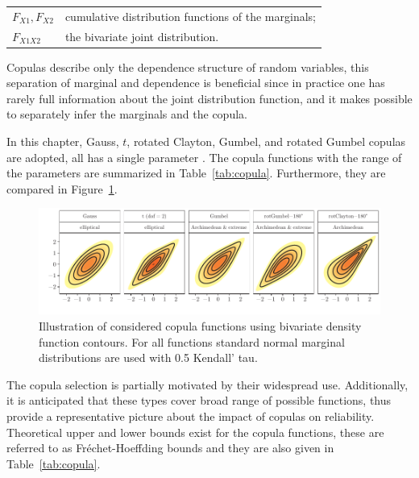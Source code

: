 \begin{tabular}{ll}
	$F_{X1}, F_{X2}$ & cumulative distribution functions of the marginals; \\
	$F_{X1X2}$ & the bivariate joint distribution.
\end{tabular} \medskip

\noindent
Copulas describe only the dependence structure of random variables, this separation of marginal and dependence is beneficial since in practice one has rarely full information about the joint distribution function, and it makes possible to separately infer the marginals and the copula.

In this chapter, Gauss, $t$, rotated Clayton, Gumbel, and rotated Gumbel copulas are adopted, all has a single parameter \citep{Nelson2006, Joe1997}. The copula functions with the range of the parameters are summarized in Table~\ref{tab:copula}. Furthermore, they are compared in Figure~\ref{fig:copula_cont}.

\begin{figure}[htbp!] 
	\centering    
	\includegraphics[]{5_copulas.pdf}
	\caption{Illustration of considered copula functions using bivariate density function contours. For all functions standard normal marginal distributions are used with 0.5 Kendall' tau.}
	\label{fig:copula_cont}
\end{figure}

The copula selection is partially motivated by their widespread use. Additionally, it is anticipated that these types cover broad range of possible functions, thus provide a representative picture about the impact of copulas on reliability. Theoretical upper and lower bounds exist for the copula functions, these are referred to as Fréchet-Hoeffding bounds \citep{Nelson2006} and they are also given in Table~\ref{tab:copula}.

